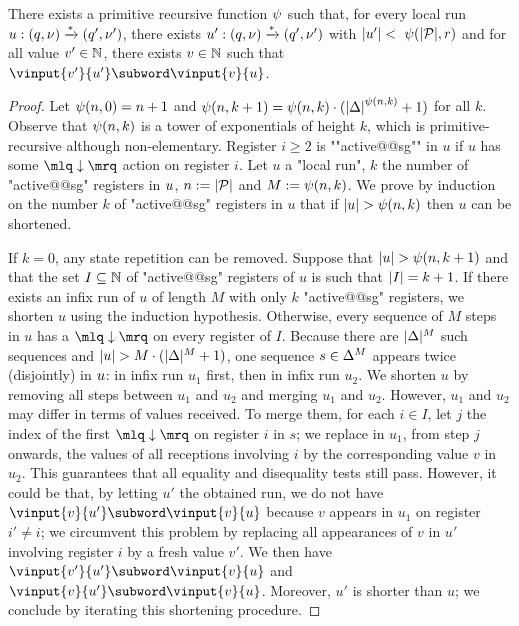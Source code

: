\begin{lemma}
\label{lem:towerbound_signature}
There exists a primitive recursive function $\psi$ such that, for every local run $u: (q,\nu) \xrightarrow{*} (q', \nu')$, there exists $u' : (q,\nu) \xrightarrow{*} (q',\nu')$ with $|u'| <~\psi(|\mathcal{P}|,r)$ and for all value $v' \in \mathbb{N}$, there exists $v \in \mathbb{N}$ such that  $\vinput{v'}{u'} \subword \vinput{v}{u}$. 
\end{lemma}
\begin{proof}
Let $\psi(n,0) = n+1$ and $\psi(n,k+1) = \psi(n,k) \cdot ({|\Delta|}^{\psi(n,k)}+1)$ for all $k$. Observe that $\psi(n,k)$ is a tower of exponentials of height $k$, which is primitive-recursive although non-elementary. Register $i \geq 2$ is ""active@@sg"" in $u$ if $u$ has some $\quotemarks{\enregact}$ action on register $i$. Let $u$ a "local run", $k$ the number of "active@@sg" registers in $u$, $n := |\mathcal{P}|$ and $M := \psi(n,k)$.
We prove by induction on the number $k$ of "active@@sg" registers in $u$  that if $|u| >\psi(n,k)$ then $u$ can be shortened. 
 

If $k=0$, any state repetition can be removed. Suppose that $|u| > \psi(n,k+1)$ and that the set $I \subseteq \mathbb{N}$ of "active@@sg" registers of $u$ is such that $|I| = k+1$. If there exists an infix run of $u$ of length $M$ with only $k$ "active@@sg" registers, we shorten $u$ using the induction hypothesis. Otherwise, every sequence of $M$ steps in $u$ has a $\quotemarks{\enregact}$ on every register of $I$. Because there are $|\Delta|^M$ such sequences and $|u| > M \cdot (|\Delta|^M +1)$, one sequence $s \in \Delta^M$ appears twice (disjointly) in $u$: in infix run $u_1$ first, then in infix run $u_2$. We shorten $u$ by removing all steps between $u_1$ and $u_2$ and merging $u_1$ and $u_2$. However, $u_1$ and $u_2$ may differ in terms of values received. To merge them, for each $i \in I$, let $j$ the index of the first $\quotemarks{\enregact}$ on register $i$ in $s$; we replace in $u_1$, from step $j$ onwards, the values of all receptions involving $i$ by the corresponding value $v$ in $u_2$. 
 This guarantees that all equality and disequality tests still pass. However, it could be that, by letting $u'$ the obtained run, we do not have $\vinput{v}{u'} \subword \vinput{v}{u}$ because $v$ appears in $u_1$ on register $i' \ne i$; we circumvent this problem by replacing all appearances of $v$ in $u'$ involving register $i$ by a fresh value $v'$. We then have $\vinput{v'}{u'} \subword \vinput{v}{u}$ and $\vinput{v}{u'} \subword \vinput{v}{u}$. Moreover, $u'$ is shorter than $u$; we conclude by iterating this shortening procedure.
\end{proof}

